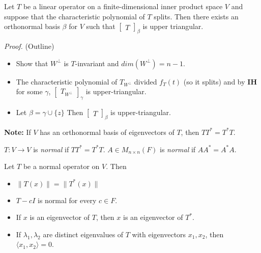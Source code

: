 \documentclass[12pt]{article}
\newenvironment{theorem}[2][Theorem]{\begin{trivlist}
\item[\hskip \labelsep {\bfseries #1}\hskip \labelsep {\bfseries #2.}]}{\end{trivlist}}
\newenvironment{definition}[2][Definition]{\begin{trivlist}
\item[\hskip \labelsep {\bfseries #1}\hskip \labelsep {\bfseries #2}]}{\end{trivlist}}
\begin{document}
\begin{theorem}{6.14 (Schur)}
Let $T$ be a linear operator on a finite-dimensional inner product space $V$ and suppose that the characteristic polynomial of $T$ splits. Then there exists an orthonormal basis $\beta$ for $V$ such that $\begin{bmatrix}
T
\end{bmatrix}_\beta$ is upper triangular.
\end{theorem}

\textit{Proof.} (Outline)

\begin{itemize}
    \item Show that $W^\perp$ is $T$-invariant and $dim(W^\perp) = n - 1$.
    
    \item The characteristic polynomial of $T_{W^\perp}$ divided $f_T(t)$ (so it splits) and by \textbf{IH} for some $\gamma$, $\begin{bmatrix}
    T_{W^\perp}
    \end{bmatrix}_\gamma$ is upper-triangular.
    
    \item Let $\beta = \gamma \cup \{z\}$ Then $\begin{bmatrix}
    T
    \end{bmatrix}_\beta$ is upper-triangular.
\end{itemize}

\noindent\textbf{Note:} If $V$ has an orthonormal basis of eigenvectors of $T$, then $TT^* = T^*T$.

\begin{definition}{7}
$T : V \to V$ is \textit{normal} if $TT^* = T^*T$. $A \in M_{n \times n}(F)$ is \textit{normal} if $AA^* = A^*A$.
\end{definition}

\begin{theorem}{6.15}
Let $T$ be a normal operator on $V$. Then 

\begin{itemize}
    \item[(a)] $\lVert T(x) \rVert = \lVert T^*(x) \rVert$
    
    \item[(b)] $T - cI$ is normal for every $c \in F$.
    
    \item[(c)] If $x$ is an eigenvector of $T$, then $x$ is an eigenvector of $T^*$.
    
    \item[(d)] If $\lambda_1, \lambda_2$ are distinct eigenvalues of $T$ with eigenvectors $x_1, x_2$, then $\langle x_1, x_2 \rangle = 0$.
\end{itemize}
\end{theorem}
\end{document}
